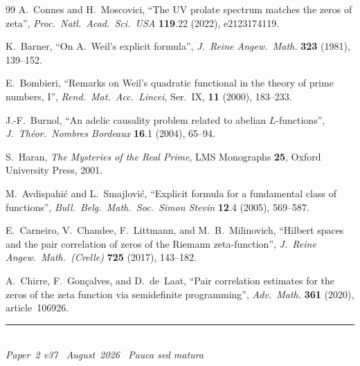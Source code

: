 \documentclass[11pt]{article}
\begin{document}
\begin{thebibliography}{99}
A.~Connes and H.~Moscovici,
``The UV prolate spectrum matches the zeros of zeta'',
\emph{Proc.\ Natl.\ Acad.\ Sci.\ USA} \textbf{119}.22 (2022),
e2123174119.

K.~Barner,
``On A.~Weil's explicit formula'',
\emph{J.\ Reine Angew.\ Math.} \textbf{323} (1981), 139--152.

E.~Bombieri,
``Remarks on Weil's quadratic functional in the theory
of prime numbers, I'',
\emph{Rend.\ Mat.\ Acc.\ Lincei}, Ser.~IX,
\textbf{11} (2000), 183--233.

J.-F.~Burnol,
``An adelic causality problem related to abelian
$L$-functions'',
\emph{J.\ Th\'eor.\ Nombres Bordeaux} \textbf{16}.1
(2004), 65--94.

S.~Haran,
\emph{The Mysteries of the Real Prime},
LMS Monographs \textbf{25}, Oxford University Press, 2001.

M.~Avdispahi\'c and L.~Smajlovi\'c,
``Explicit formula for a fundamental class of functions'',
\emph{Bull.\ Belg.\ Math.\ Soc.\ Simon Stevin}
\textbf{12}.4 (2005), 569--587.

E.~Carneiro, V.~Chandee, F.~Littmann,
and M.~B.~Milinovich,
``Hilbert spaces and the pair correlation of zeros
of the Riemann zeta-function'',
\emph{J.\ Reine Angew.\ Math.\ (Crelle)}
\textbf{725} (2017), 143--182.

A.~Chirre, F.~Gon\c{c}alves, and D.~de~Laat,
``Pair correlation estimates for the zeros of the
zeta function via semidefinite programming'',
\emph{Adv.\ Math.} \textbf{361} (2020),
article~106926.

\end{thebibliography}

\enlargethispage{3\baselineskip}
\vspace*{\fill}
\begin{minipage}{\linewidth}
\rule{\linewidth}{0.4pt}\smallskip\\
\small\emph{Paper~2 v37 \textperiodcentered\ August~2026
\textperiodcentered\ Pauca sed matura}
\end{minipage}
\end{document}
